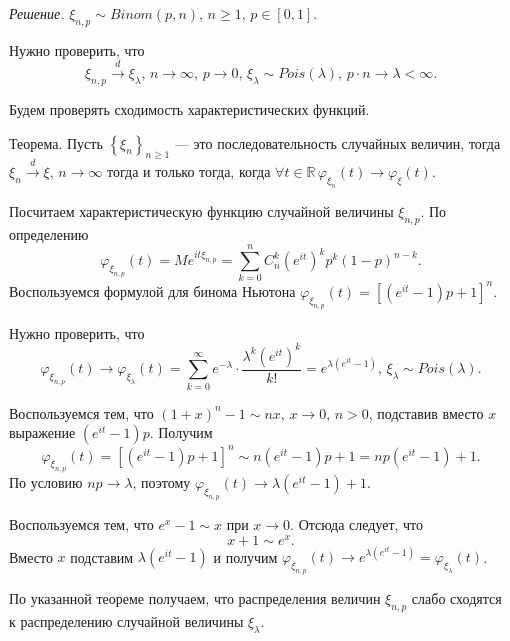 \textit{Решение.}
$ \xi_{n, p} \sim Binom \left( p, n \right), \, n \geq 1, \, p \in \left[ 0, 1 \right] $.

Нужно проверить,
что
$$ \xi_{n, p} \overset{d}{ \rightarrow } \xi_{ \lambda }, \,
n \rightarrow \infty, \,
p \rightarrow 0, \,
\xi_{ \lambda } \sim Pois \left( \lambda \right), \,
p \cdot n \rightarrow \lambda < \infty.$$

Будем проверять сходимость характеристических функций.

Теорема.
Пусть $ \left\{ \xi_n \right\}_{n \geq 1}$ --- это последовательность случайных величин,
тогда $ \xi_n \overset{d}{ \rightarrow } \xi, \, n \rightarrow \infty $ тогда и только тогда,
когда
$ \forall t \in \mathbb{R} \,
\varphi_{ \xi_n} \left( t \right) \rightarrow \varphi_{ \xi } \left( t \right) $.

Посчитаем характеристическую функцию случайной величины $ \xi_{n, p}$.
По определению
$$ \varphi_{ \xi_{n, p}} \left( t \right) =
Me^{it \xi_{n, p}} =
\sum \limits_{k = 0}^{n} C_n^k \left( e^{it} \right)^k p^k \left( 1 - p \right)^{n-k}.$$
Воспользуемся формулой для бинома Ньютона
$ \varphi_{ \xi_{n, p}} \left( t \right) = \left[ \left( e^{it} - 1 \right) p + 1 \right]^n$.

Нужно проверить, что
$$ \varphi_{ \xi_{n, p}} \left( t \right) \rightarrow
\varphi_{ \xi_{ \lambda }} \left( t \right) =
\sum \limits_{k = 0}^{ \infty } e^{- \lambda } \cdot \frac{ \lambda^k \left( e^{it} \right)^k}{k!} =
e^{ \lambda \left( e^{it} - 1 \right) }, \,
\xi_{ \lambda } \sim Pois \left( \lambda \right).$$

Воспользуемся тем, что $ \left( 1 + x \right)^n - 1 \sim nx, \, x \rightarrow 0, \, n > 0$,
подставив вместо $x$ выражение $ \left( e^{it} - 1 \right) p$.
Получим
$$ \varphi_{ \xi_{n, p}} \left( t \right) =
\left[ \left( e^{it} - 1 \right) p + 1 \right]^n \sim n \left( e^{it} - 1 \right) p + 1 =
np \left( e^{it} - 1 \right) + 1.$$
По условию
$np \rightarrow \lambda $,
поэтому $ \varphi_{ \xi_{n, p}} \left( t \right) \rightarrow \lambda \left( e^{it} - 1 \right) + 1$.

Воспользуемся тем, что $e^x - 1 \sim x$ при $x \rightarrow 0$.
Отсюда следует, что
$$x + 1 \sim e^x.$$
Вместо $x$ подставим $ \lambda \left( e^{it} - 1 \right) $ и получим
$ \varphi_{ \xi_{n, p}} \left( t \right) \rightarrow e^{ \lambda \left( e^{it} - 1 \right) } =
\varphi_{ \xi_{ \lambda }} \left( t \right) $.

По указанной теореме получаем, что распределения величин $ \xi_{n, p}$
слабо сходятся к распределению случайной величины $ \xi_{ \lambda }$.

